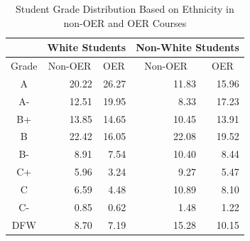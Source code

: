 \documentclass[11pt]{article}
\begin{document}
\begin{table}
\centering
\begin{tabular}{crrrr}
  & \multicolumn{2}{c}{White Students} & \multicolumn{2}{c}{Non-White Students} \\ \hline
  \multicolumn{1}{c}{Grade} & \multicolumn{1}{c}{Non-OER} & \multicolumn{1}{c}{OER} & \multicolumn{1}{c}{Non-OER} & \multicolumn{1}{c}{OER}\\ \hline
  A\hspace{1.1ex} & 20.22 & 26.27 & 11.83 & 15.96 \\
  A-\hspace{0.7ex} & 12.51 & 19.95 & 8.33 & 17.23 \\
  B+ & 13.85 & 14.65 & 10.45 & 13.91 \\
  B\hspace{1.1ex} & 22.42 & 16.05 & 22.08 & 19.52 \\
  B-\hspace{0.7ex} & 8.91 & 7.54 & 10.40 & 8.44 \\
  C+ & 5.96 & 3.24 & 9.27 & 5.47 \\
  C\hspace{1.1ex} & 6.59 & 4.48 & 10.89 & 8.10 \\
  C-\hspace{0.8ex} & 0.85 & 0.62 & 1.48 & 1.22 \\
  DFW & 8.70 & 7.19 & 15.28 & 10.15 \\ \hline
\end{tabular}
\caption{Student Grade Distribution Based on Ethnicity in non-OER and OER Courses \cite{CB-WC-PH:18}}
\label{tab:ethnic-oer}
\end{table}
\end{document}
